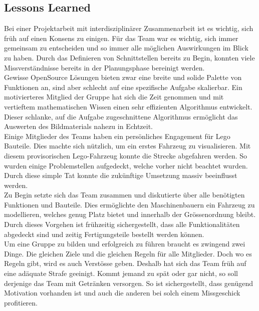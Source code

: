 \subsection{Lessons Learned}
Bei einer Projektarbeit mit interdisziplinärer Zusammenarbeit ist es wichtig, sich früh auf einen Konsens zu einigen.
Für das Team war es wichtig, sich immer gemeinsam zu entscheiden und so immer alle möglichen Auswirkungen im Blick zu haben.
Durch das Definieren von Schnittstellen bereits zu Begin, konnten viele Missverständnisse bereits in der Planungsphase bereinigt werden.
\\[0.2cm]
Gewisse OpenSource Lösungen bieten zwar eine breite und solide Palette von Funktionen an, sind aber schlecht auf eine spezifische Aufgabe skalierbar.
Ein motivierteres Mitglied der Gruppe hat sich die Zeit genommen und mit vertieftem mathematischen Wissen einen sehr effizienten Algorithmus entwickelt.
Dieser schlanke, auf die Aufgabe zugeschnittene Algorithmus ermöglicht das Auswerten des Bildmaterials nahezu in Echtzeit.
\\[0.2cm]
Einige Mitglieder des Teams haben ein persönliches Engagement für Lego Bauteile. Dies machte sich nützlich, um ein erstes Fahrzeug zu visualisieren.
Mit diesem provisorischen Lego-Fahrzeug konnte die Strecke abgefahren werden. So wurden einige Problemstellen aufgedeckt, welche vorher nicht beachtet wurden. Durch diese simple Tat konnte die zukünftige Umsetzung massiv beeinflusst werden.
\\[0.2cm]
Zu Begin setzte sich das Team zusammen und diskutierte über alle benötigten Funktionen und Bauteile.
Dies ermöglichte den Maschinenbauern ein Fahrzeug zu modellieren, welches genug Platz bietet und innerhalb der Grössenordnung bleibt.
Durch dieses Vorgehen ist frühzeitig sichergestellt, dass alle Funktionalitäten abgedeckt sind und zeitig Fertigungsteile bestellt werden können.
\\[0.2cm]
Um eine Gruppe zu bilden und erfolgreich zu führen braucht es zwingend zwei Dinge.
Die gleichen Ziele und die gleichen Regeln für alle Mitglieder.
Doch wo es Regeln gibt, wird es auch Verstösse geben. Deshalb hat sich das Team früh auf eine adäquate Strafe geeinigt.
Kommt jemand zu spät oder gar nicht, so soll derjenige das Team mit Getränken versorgen.
So ist sichergestellt, dass genügend Motivation vorhanden ist und auch die anderen bei solch einem Missgeschick profitieren.